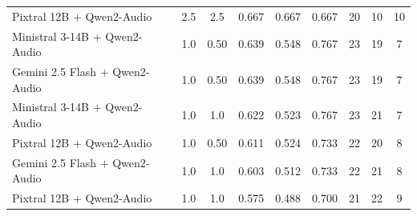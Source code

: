 {\begin{longtable}{lcccccccc}
    Pixtral 12B + Qwen2-Audio & 2.5 & 2.5 & 0.667 & 0.667 & 0.667 & 20 & 10 & 10 \\
    Ministral 3-14B + Qwen2-Audio & 1.0 & 0.50 & 0.639 & 0.548 & 0.767 & 23 & 19 & 7 \\
    Gemini 2.5 Flash + Qwen2-Audio & 1.0 & 0.50 & 0.639 & 0.548 & 0.767 & 23 & 19 & 7 \\
    Ministral 3-14B + Qwen2-Audio & 1.0 & 1.0 & 0.622 & 0.523 & 0.767 & 23 & 21 & 7 \\
    Pixtral 12B + Qwen2-Audio & 1.0 & 0.50 & 0.611 & 0.524 & 0.733 & 22 & 20 & 8 \\
    Gemini 2.5 Flash + Qwen2-Audio & 1.0 & 1.0 & 0.603 & 0.512 & 0.733 & 22 & 21 & 8 \\
     Pixtral 12B + Qwen2-Audio & 1.0 & 1.0 & 0.575 & 0.488 & 0.700 & 21 & 22 & 9 \\
\end{longtable}
}


